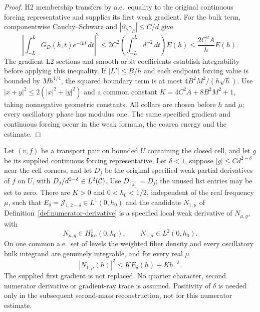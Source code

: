 \begin{proof}
\leanok
H2 membership transfers by a.e.\ equality to the original continuous
forcing representative and supplies its first weak gradient.
For the bulk term, componentwise Cauchy--Schwarz and
$|\partial_h\gamma_h|\le C/d$ give
\[
 \left|\int_{-L}^L G_D(h,t)e^{-i\mu t}\,dt\right|^2
 \le 2C^2\left(\int_{-L}^L d^{-2}\,dt\right)E(h)
 \le \frac{2C^2A}{h}E(h).
\]
The gradient L2 sections and smooth orbit coefficients establish
integrability before applying this inequality.
If $|L'|\le B/h$ and each endpoint forcing value is bounded by
$Mh^{1/4}$, the squared boundary term is at most
$4B^2M^2/(h\sqrt h)$.
Use $|x+y|^2\le2(|x|^2+|y|^2)$ and a common constant
$K=4C^2A+8B^2M^2+1$, taking nonnegative geometric constants.
All collars are chosen before $h$ and $\mu$; every oscillatory phase
has modulus one. The same specified gradient and continuous forcing
occur in the weak formula, the coarea energy and the estimate.
\end{proof}

\begin{lemma}
\label{lem:subcritical-numerator-derivative}
\leanok
Let $(v,f)$ be a transport pair on bounded $U$ containing the closed cell,
and let $g$ be its supplied continuous forcing representative.
Let $\delta<1$, suppose $|g|\le Cd^{2-\delta}$ near the cell corners,
and let $D_j$ be the original specified weak partial derivatives of $f$
on $U$, with $D_j/d^{2-\delta}\in L^2(\mathcal{C})$.
Use $D_{[j]}=D_j$; the unused list entries may be set to zero.
There are $K>0$ and $0<h_0<1/2$, independent of the real frequency $\mu$,
such that $E_\delta=\mathcal J_{1,2-\delta}\in L^1(0,h_0)$ and the
candidate $N_{1,\mu}$ of Definition~\ref{def:numerator-derivative}
is a specified local weak derivative of $N_{\mu,g}$, with
\[
 N_{\mu,g}\in H^1_{\mathrm{loc}}(0,h_0),\qquad
 N_{1,\mu}\in L^2(0,h_0).
\]
On one common a.e.\ set of levels the weighted fiber density and every
oscillatory bulk integrand are genuinely integrable, and for every real $\mu$
\[
 |N_{1,\mu}(h)|^2\le K E_\delta(h)+K h^{-\delta}.
\]
The supplied first gradient is not replaced. No quarter character, second
numerator derivative or gradient-ray trace is assumed. Positivity of
$\delta$ is needed only in the subsequent second-mass reconstruction,
not for this numerator estimate.
\end{lemma}

